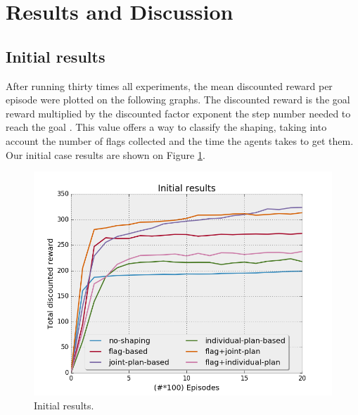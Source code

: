 \documentclass[letterpaper]{article}
\begin{document}
\section{Results and Discussion}
\subsection{Initial results}

After running thirty times all experiments, the mean discounted reward per episode were plotted on the following graphs. The discounted reward is the goal reward multiplied by the discounted factor exponent the step number needed to reach the goal  \citep{SCpbrs}. This value offers a way to classify the shaping, taking into account the number of flags collected and the time the agents takes to get them.\\
 Our initial case results are shown on Figure \ref{fig:results1}. \\

\begin{figure}[h!]
  \includegraphics[width=\linewidth]{img/initial.png}
  \caption{Initial results.}
  \label{fig:results1}
\end{figure}
\end{document}
